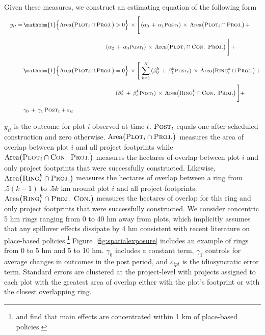 \documentclass[12pt]{article}
\begin{document}
Given these measures, we construct an estimating equation of the following form
\begin{align}
\label{eq:main}
\begin{split}
\quad y_{it}  =\,&\mathbbm{1}\Big\{\text{Area}\big(\textsc{Plot}_i  \cap  \textsc{Proj.}\big)>0\Big \}\,\times \Bigg[ \, ( \alpha_0 \, +  \, \alpha_1 \textsc{\small Post}_{t}) \, \times \, \text{Area}\big(\textsc{Plot}_i  \cap  \textsc{Proj.}\big) \, + \\[.5em]
&\hspace{14.5em}( \alpha_2 \, +  \, \alpha_3 \textsc{\small Post}_{t})  \, \times \, \text{Area}\big(\textsc{Plot}_i \cap \textsc{Con. Proj.}\big)\, \Bigg] \, + \\[.7em]
&\mathbbm{1}\Big\{\text{Area}\big(\textsc{Plot}_i  \cap  \textsc{Proj.}\big)=0\Big \}\,\times \Bigg[ \, \sum_{k=1}^{K} \, (\beta_{0}^{k} \,+\, \beta_{1}^{k} \textsc{\small Post}_{t})  \, \times \, \text{Area}\big(\textsc{Ring}_i^{k}  \cap  \textsc{Proj.}\big) \, + \\[.5em]
&\hspace{16.2em}(\beta_{2}^{k} \,+\, \beta_{3}^{k} \textsc{\small Post}_{t})  \, \times \,\text{Area}\big(\textsc{Ring}_i^{k}  \cap \textsc{Con. Proj.}\big)\, \Bigg]  +  \\[.5em]
&\gamma_0 \,+\, \gamma_1 \, \textsc{Post}_t + \varepsilon_{it}
\end{split}
\end{align}

\noindent $y_{it}$ is the outcome for plot $i$ observed at time $t$.  $\textsc{Post}_{t}$ equals one after scheduled construction and zero otherwise.  $\text{Area}\big(\textsc{Plot}_i  \cap  \textsc{Proj.}\big)$ measures the area of overlap between plot $i$ and all project footprints while $\text{Area}\big(\textsc{Plot}_i \cap \textsc{Con. Proj.}\big)$ measures the hectares of overlap between plot $i$ and only project footprints that were successfully constructed.  Likewise, $\text{Area}\big(\textsc{Ring}_i^{k}  \cap  \textsc{Proj.}\big)$ measures the  hectares of overlap between a ring from $.5(k-1)$ to $.5k$ km around plot $i$ and all project footprints.   $\text{Area}\big(\textsc{Ring}_i^{k}  \cap  \textsc{Proj. Con.}\big)$ measures the hectares of overlap for this ring and only project footprints that were successfully constructed.  We consider concentric 5 hm rings ranging from 0 to 40 hm away from plots, which implicitly assumes that any spillover effects dissipate by 4 hm consistent with recent literature on place-based policies.\footnote{\cite{diamond2016wants} and \cite{rossi2010housing} find that main effects are concentrated within 1 km of place-based policies.}  Figure~\ref{fig:spatialexposure} includes an example of rings from 0 to 5 hm and 5 to 10 hm.  $\gamma_0$ includes a constant term, $\gamma_1$ controls for average changes in outcomes in the post period, and $\varepsilon_{ipt}$ is the idiosyncratic error term.  Standard errors are clustered at the project-level with projects assigned to each plot with the greatest area of overlap either with the plot's footprint or with the closest overlapping ring.  
\end{document}
